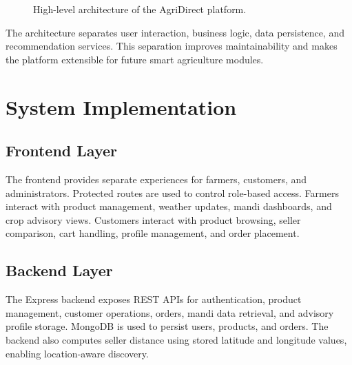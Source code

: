 \documentclass[conference]{IEEEtran}
\begin{document}
\begin{figure}[htbp]
\centering
{}
\caption{High-level architecture of the AgriDirect platform.}
\label{fig:architecture}
\end{figure}

The architecture separates user interaction, business logic, data persistence, and recommendation services. This separation improves maintainability and makes the platform extensible for future smart agriculture modules.

\section{System Implementation}
\subsection{Frontend Layer}
The frontend provides separate experiences for farmers, customers, and administrators. Protected routes are used to control role-based access. Farmers interact with product management, weather updates, mandi dashboards, and crop advisory views. Customers interact with product browsing, seller comparison, cart handling, profile management, and order placement.

\subsection{Backend Layer}
The Express backend exposes REST APIs for authentication, product management, customer operations, orders, mandi data retrieval, and advisory profile storage. MongoDB is used to persist users, products, and orders. The backend also computes seller distance using stored latitude and longitude values, enabling location-aware discovery.
\end{document}
